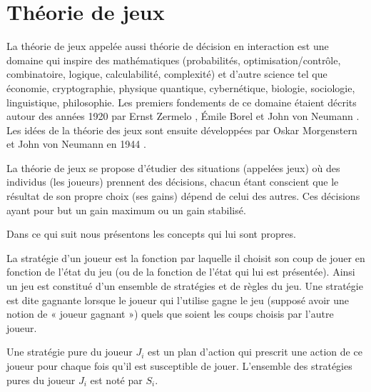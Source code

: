 
\section{Théorie de jeux}

La théorie de jeux appelée aussi théorie de décision en interaction est une domaine qui inspire des mathématiques (probabilités, optimisation/contrôle, combinatoire, logique, calculabilité, complexité) et d’autre science tel que économie, cryptographie, physique quantique, cybernétique, biologie, sociologie, linguistique, philosophie.
Les premiers fondements de ce domaine étaient décrits autour des années 1920 par Ernst Zermelo \citep{ErnstZermelo1913}, Émile Borel \citep{EmileBorel1921} et John von Neumann \citep{JohnvonNeumann1928}. Les idées de la théorie des jeux sont ensuite développées par Oskar Morgenstern et John von Neumann en 1944 \citep{JO1944}.

La théorie de jeux se propose d'étudier des situations (appelées jeux) où des individus (les joueurs) prennent des décisions, chacun étant conscient que le résultat de son propre choix (ses gains) dépend de celui des autres. Ces décisions ayant pour but un gain maximum ou un gain stabilisé.

Dans ce qui suit nous présentons les concepts qui lui sont propres.

\begin{definition}[Stratégie]
	La stratégie d’un joueur est la fonction par laquelle il choisit son coup de jouer en fonction de l’état du jeu (ou de la fonction de l’état qui lui est présentée). Ainsi un jeu est constitué d'un ensemble de stratégies et de règles du jeu.  Une stratégie est dite gagnante lorsque le joueur qui l’utilise gagne le jeu (supposé avoir une notion de « joueur gagnant ») quels que soient les coups choisis par l’autre joueur.	
\end{definition}

\begin{definition}
	Une stratégie pure du joueur $J_i$ est un plan d’action qui prescrit une action de ce joueur pour chaque fois qu’il est susceptible de jouer. L’ensemble des stratégies pures du joueur $J_i$ est noté par $S_i$.
\end{definition}

